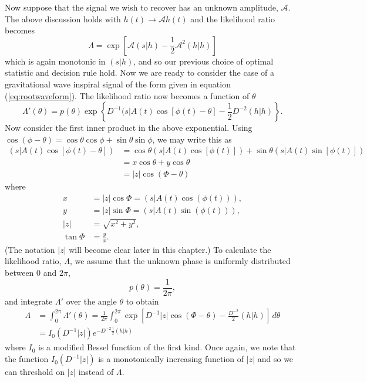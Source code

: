 Now suppose that the signal we wish to recover has an unknown amplitude,
$\mathcal{A}$. The above discussion holds with $h(t) \rightarrow
\mathcal{A}h(t)$ and the likelihood ratio becomes
\begin{equation}
\Lambda = \exp\left[\mathcal{A}(s|h) - \frac{1}{2}\mathcal{A}^2(h|h)\right]
\end{equation}
which is again monotonic in $(s|h)$, and so our previous choice of optimal
statistic and decision rule hold. Now we are ready to consider the case of a
gravitational wave inspiral signal of the form given in equation
(\ref{eq:rootwaveform}).  The likelihood ratio now becomes a function of
$\theta$
\begin{equation}
\Lambda'(\theta) = 
p(\theta) \exp\left\{D^{-1}(s|A(t)\cos\left[\phi(t) - \theta\right] -
\frac{1}{2}D^{-2}(h|h)\right\}.
\end{equation}
Now consider the first inner product in the above exponential. Using
$\cos(\phi - \theta) = \cos\theta\cos\phi + \sin\theta\sin\phi$, we may write
this as
\begin{equation}
\begin{split}
\left(s\big|A(t)\cos\left[\phi(t) - \theta\right]\right)  &= 
\cos\theta \left(s\big|A(t)\cos\left[\phi(t)\right]\right) + 
\sin\theta \left(s\big|A(t)\sin\left[\phi(t)\right]\right)  \\
& = x\cos\theta + y\cos\theta \\
& = |z|\cos(\Phi - \theta)
\end{split}
\end{equation}
where
\begin{align}
x &= |z|\cos\Phi = \left(s\big|A(t)\cos(\phi(t))\right), \\
y &= |z|\sin\Phi = \left(s\big|A(t)\sin(\phi(t))\right), \\
|z| &= \sqrt{x^2 + y^2}, \\
\tan \Phi &= \frac{y}{x}.
\end{align}
(The notation $|z|$ will become clear later in this chapter.) To calculate the
likelihood ratio, $\Lambda$, we assume that the unknown phase is uniformly
distributed between $0$ and $2\pi$,
\begin{equation}
p(\theta) = \frac{1}{2\pi},
\end{equation}
and integrate $\Lambda'$ over the angle $\theta$ to obtain
\begin{equation}
\begin{split}
\Lambda &= \int_0^{2\pi} \Lambda'(\theta) 
= \frac{1}{2\pi}\int_0^{2\pi}\exp\left[D^{-1}|z|\cos(\Phi - \theta) -
\frac{D^{-2}}{2}(h|h)\right] \,d\theta \\
&= I_0(D^{-1}|z|) e^{-D^{-2}\frac{1}{2}(h|h)}
\end{split}
\end{equation}
where $I_0$ is a modified Bessel function of the first kind. Once again, we
note that the function $I_0(D^{-1}|z|)$ is a monotonically increasing function
of $|z|$ and so we can threshold on $|z|$ instead of $\Lambda$. 


